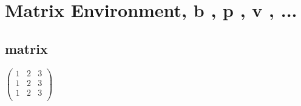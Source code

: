 \documentclass{article}
\begin{document}
	 		
	 		\section{Matrix Environment, b , p , v , ...}
	 		
	 		 	\subsection{matrix}
	 		 	
	 		 	$
	 		 		\begin{pmatrix}
	 		 			1 & 2 & 3 \\
	 		 			1 & 2 & 3 \\
	 		 			1 & 2 & 3 \\
	 		 		\end{pmatrix}
	 		 	$
	 		
\end{document}
